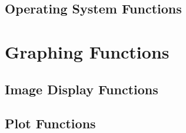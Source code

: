 \documentclass{book}
\begin{document}
\section{Operating System Functions}




\chapter{Graphing Functions}
\section{Image Display Functions}










\section{Plot Functions}











\end{document}
